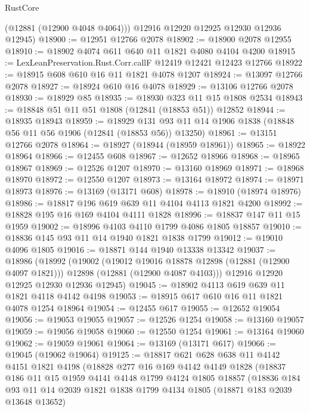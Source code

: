 \begin{lexlean}{RustCore}
\begin{coremodule}
        (@12881 (@12900 @4048 @4064)))
      @12916
      @12920
      @12925
      @12930
      @12936
      @12945)
@18900 := @12951 @12766 @2078
@18902 := @18900 @2078 @12955
@18910 := @18902 @4074 @611 @640 @11 @1821 @4080 @4104 @4200
@18915 := LexLeanPreservation.Rust.Corr.callF @12419 @12421 @12423 @12766
@18922 := @18915 @608 @610 @16 @11 @1821 @4078 @1207
@18924 := @13097 @12766 @2078
@18927 := @18924 @610 @16 @4078
@18929 := @13106 @12766 @2078
@18930 := @18929 @85
@18935 := @18930 @323 @11 @15 @1808 @2534
@18943 := @18848 @51 @11 @51 @1808 (@12841 (@18853 @51)) @12852
@18944 := @18935 @18943
@18959 := @18929
    @131
    @93
    @11
    @14
    @1906
    @1838
    (@18848 @56 @11 @56 @1906 (@12841 (@18853 @56)) @13250)
@18961 := @13151 @12766 @2078
@18964 := @18927 (@18944 (@18959 @18961))
@18965 := @18922 @18964
@18966 := @12455 @608
@18967 := @12652 @18966
@18968 := @18965 @18967
@18969 := @12526 @1207
@18970 := @13160 @18969
@18971 := @18968 @18970
@18972 := @12550 @1207
@18973 := @13164 @18972
@18974 := @18971 @18973
@18976 := @13169 (@13171 @608)
@18978 := @18910 (@18974 @18976)
@18986 := @18817 @196 @619 @639 @11 @4104 @4113 @1821 @4200
@18992 := @18828 @195 @16 @169 @4104 @4111 @1828
@18996 := @18837 @147 @11 @15 @1959
@19002 := @18996 @4103 @4110 @1799 @4086 @1805 @18857
@19010 := @18836 @145 @93 @11 @14 @1940 @1821 @1838 @1799
@19012 := @19010 @4096 @1805
@19016 := @18871 @144 @1940 @13338 @13342
@19037 := @18986
    (@18992
      (@19002
        (@19012 @19016 @18878 @12898 (@12881 (@12900 @4097 @1821)))
        @12898
        (@12881 (@12900 @4087 @4103)))
      @12916
      @12920
      @12925
      @12930
      @12936
      @12945)
@19045 := @18902 @4113 @619 @639 @11 @1821 @4118 @4142 @4198
@19053 := @18915 @617 @610 @16 @11 @1821 @4078 @1254 @18964
@19054 := @12455 @617
@19055 := @12652 @19054
@19056 := @19053 @19055
@19057 := @12526 @1254
@19058 := @13160 @19057
@19059 := @19056 @19058
@19060 := @12550 @1254
@19061 := @13164 @19060
@19062 := @19059 @19061
@19064 := @13169 (@13171 @617)
@19066 := @19045 (@19062 @19064)
@19125 := @18817
    @621
    @628
    @638
    @11
    @4142
    @4151
    @1821
    @4198
    (@18828
      @277
      @16
      @169
      @4142
      @4149
      @1828
      (@18837
        @186
        @11
        @15
        @1959
        @4141
        @4148
        @1799
        @4124
        @1805
        @18857
        (@18836
          @184
          @93
          @11
          @14
          @2039
          @1821
          @1838
          @1799
          @4134
          @1805
          (@18871 @183 @2039 @13648 @13652)

\end{coremodule}
\end{lexlean}
